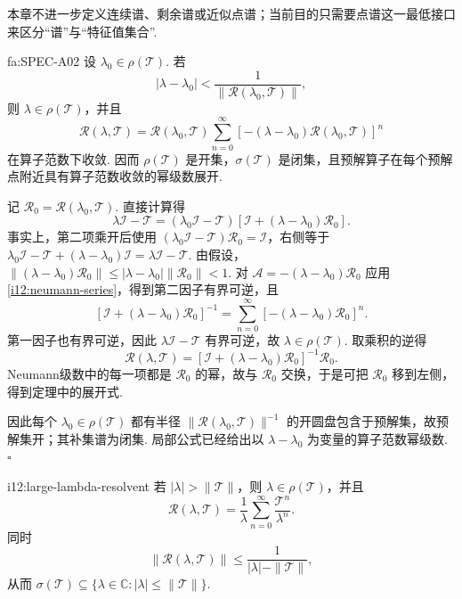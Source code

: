 本章不进一步定义连续谱、剩余谱或近似点谱；当前目的只需要点谱这一最低接口来区分“谱”与“特征值集合”.

\begin{FATheorem}[A][Neumann级数与预解集开性]{fa:SPEC-A02}
设 \(\displaystyle \lambda_0\in\rho(\mathcal T)\). 若
\[
|\lambda-\lambda_0|
<
\frac{1}{\|\mathcal R(\lambda_0,\mathcal T)\|},
\]
则 \(\displaystyle \lambda\in\rho(\mathcal T)\)，并且
\[
\mathcal R(\lambda,\mathcal T)
=
\mathcal R(\lambda_0,\mathcal T)
\sum_{n=0}^{\infty}
\left[-(\lambda-\lambda_0)\mathcal R(\lambda_0,\mathcal T)\right]^n
\]
在算子范数下收敛. 因而 \(\displaystyle \rho(\mathcal T)\) 是开集，\(\displaystyle \sigma(\mathcal T)\) 是闭集，且预解算子在每个预解点附近具有算子范数收敛的幂级数展开.
\end{FATheorem}

\begin{FAProof}
记 \(\displaystyle \mathcal R_0=\mathcal R(\lambda_0,\mathcal T)\). 直接计算得
\[
\lambda\mathcal I-\mathcal T
=
(\lambda_0\mathcal I-\mathcal T)
\left[
\mathcal I+(\lambda-\lambda_0)\mathcal R_0
\right].
\]
事实上，第二项乘开后使用 \(\displaystyle (\lambda_0\mathcal I-\mathcal T)\mathcal R_0=\mathcal I\)，右侧等于 \(\displaystyle \lambda_0\mathcal I-\mathcal T+(\lambda-\lambda_0)\mathcal I=\lambda\mathcal I-\mathcal T\). 由假设，
\(\displaystyle \|(\lambda-\lambda_0)\mathcal R_0\| \leqslant |\lambda-\lambda_0|\|\mathcal R_0\| <1\).
对 \(\displaystyle \mathcal A=-(\lambda-\lambda_0)\mathcal R_0\) 应用\autoref{i12:neumann-series}，得到第二因子有界可逆，且
\[
\left[
\mathcal I+(\lambda-\lambda_0)\mathcal R_0
\right]^{-1}
=
\sum_{n=0}^{\infty}
\left[-(\lambda-\lambda_0)\mathcal R_0\right]^n.
\]
第一因子也有界可逆，因此 \(\displaystyle \lambda\mathcal I-\mathcal T\) 有界可逆，故 \(\displaystyle \lambda\in\rho(\mathcal T)\). 取乘积的逆得
\[
\mathcal R(\lambda,\mathcal T)
=
\left[
\mathcal I+(\lambda-\lambda_0)\mathcal R_0
\right]^{-1}
\mathcal R_0.
\]
Neumann级数中的每一项都是 \(\displaystyle \mathcal R_0\) 的幂，故与 \(\displaystyle \mathcal R_0\) 交换，于是可把 \(\displaystyle \mathcal R_0\) 移到左侧，得到定理中的展开式.

因此每个 \(\displaystyle \lambda_0\in\rho(\mathcal T)\) 都有半径 \(\displaystyle \|\mathcal R(\lambda_0,\mathcal T)\|^{-1}\) 的开圆盘包含于预解集，故预解集开；其补集谱为闭集. 局部公式已经给出以 \(\displaystyle \lambda-\lambda_0\) 为变量的算子范数幂级数.
\hfill\(\square\)
\end{FAProof}

\begin{FACorollary}[B][大参数预解展开]{i12:large-lambda-resolvent}
若 \(\displaystyle |\lambda|>\|\mathcal T\|\)，则 \(\displaystyle \lambda\in\rho(\mathcal T)\)，并且
\[
\mathcal R(\lambda,\mathcal T)
=
\frac{1}{\lambda}
\sum_{n=0}^{\infty}
\frac{\mathcal T^n}{\lambda^n}.
\]
同时
\[
\|\mathcal R(\lambda,\mathcal T)\|
\leqslant
\frac{1}{|\lambda|-\|\mathcal T\|},
\]
从而
\(\displaystyle \sigma(\mathcal T) \subseteq \{\lambda\in\mathbb C:|\lambda|\leqslant\|\mathcal T\|\}\).
\end{FACorollary}

